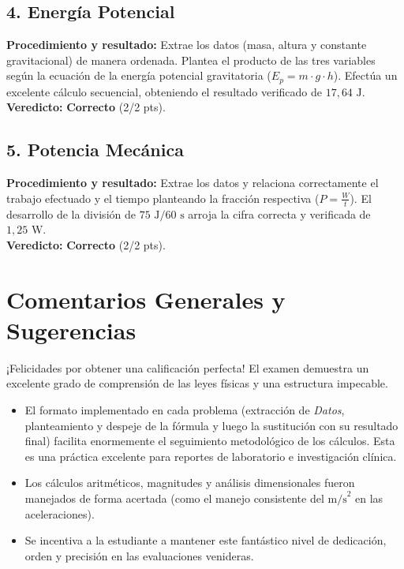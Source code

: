\documentclass[12pt,letterpaper]{article}
\begin{document}
\subsection*{4. Energía Potencial}
\textbf{Procedimiento y resultado:} Extrae los datos (masa, altura y constante gravitacional) de manera ordenada. Plantea el producto de las tres variables según la ecuación de la energía potencial gravitatoria ($E_p = m \cdot g \cdot h$). Efectúa un excelente cálculo secuencial, obteniendo el resultado verificado de $17,64 \text{ J}$. \\
\textbf{Veredicto:} \textbf{Correcto} (2/2 pts).

\subsection*{5. Potencia Mecánica}
\textbf{Procedimiento y resultado:} Extrae los datos y relaciona correctamente el trabajo efectuado y el tiempo planteando la fracción respectiva ($P = \frac{W}{t}$). El desarrollo de la división de $75 \text{ J} / 60 \text{ s}$ arroja la cifra correcta y verificada de $1,25 \text{ W}$. \\
\textbf{Veredicto:} \textbf{Correcto} (2/2 pts).

\vspace{0.5cm}
\section*{Comentarios Generales y Sugerencias}
¡Felicidades por obtener una calificación perfecta! El examen demuestra un excelente grado de comprensión de las leyes físicas y una estructura impecable.
\begin{itemize}
    \item El formato implementado en cada problema (extracción de \textit{Datos}, planteamiento y despeje de la fórmula y luego la sustitución con su resultado final) facilita enormemente el seguimiento metodológico de los cálculos. Esta es una práctica excelente para reportes de laboratorio e investigación clínica.
    \item Los cálculos aritméticos, magnitudes y análisis dimensionales fueron manejados de forma acertada (como el manejo consistente del $\text{m/s}^2$ en las aceleraciones).
    \item Se incentiva a la estudiante a mantener este fantástico nivel de dedicación, orden y precisión en las evaluaciones venideras.
\end{itemize}
\end{document}
